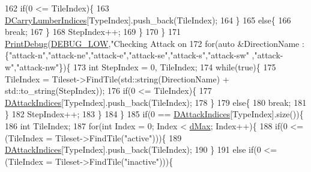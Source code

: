 \begin{DoxyCode}
{{{{162                     \textcolor{keywordflow}{if}(0 <= TileIndex)\{
163                         \hyperlink{classCAssetRenderer_a986dc401334deb267cb772ff0650fcb6}{DCarryLumberIndices}[TypeIndex].push\_back(TileIndex);
164                     \}
165                     \textcolor{keywordflow}{else}\{
166                         \textcolor{keywordflow}{break};   
167                     \}
168                     StepIndex++;
169                 \}
170             \}
171             \hyperlink{Debug_8h_aa5f00f5537c9760f6ae1782460748ab9}{PrintDebug}(\hyperlink{Debug_8h_a3a5f3fc09784650d8388cb854882f840}{DEBUG\_LOW},\textcolor{stringliteral}{"Checking Attack on %
172             \textcolor{keywordflow}{for}(\textcolor{keyword}{auto} &DirectionName : \{\textcolor{stringliteral}{"attack-n"},\textcolor{stringliteral}{"attack-ne"},\textcolor{stringliteral}{"attack-e"},\textcolor{stringliteral}{"attack-se"},\textcolor{stringliteral}{"attack-s"},\textcolor{stringliteral}{"attack-sw"}
      ,\textcolor{stringliteral}{"attack-w"},\textcolor{stringliteral}{"attack-nw"}\})\{
173                 \textcolor{keywordtype}{int} StepIndex = 0, TileIndex;
174                 \textcolor{keywordflow}{while}(\textcolor{keyword}{true})\{
175                     TileIndex = Tileset->FindTile(std::string(DirectionName) + std::to\_string(StepIndex));
176                     \textcolor{keywordflow}{if}(0 <= TileIndex)\{
177                         \hyperlink{classCAssetRenderer_acc2d0fab5a9f1f35a1d5eaf28ff743cc}{DAttackIndices}[TypeIndex].push\_back(TileIndex);
178                     \}
179                     \textcolor{keywordflow}{else}\{
180                         \textcolor{keywordflow}{break};   
181                     \}
182                     StepIndex++;
183                 \}
184             \}
185             \textcolor{keywordflow}{if}(0 == \hyperlink{classCAssetRenderer_acc2d0fab5a9f1f35a1d5eaf28ff743cc}{DAttackIndices}[TypeIndex].size())\{
186                 \textcolor{keywordtype}{int} TileIndex;
187                 \textcolor{keywordflow}{for}(\textcolor{keywordtype}{int} Index = 0; Index < \hyperlink{GameDataTypes_8h_acb2b033915f6659a71a38b5aa6e4eb42af6546049275557ce0ade2ceee042a319}{dMax}; Index++)\{
188                     \textcolor{keywordflow}{if}(0 <= (TileIndex = Tileset->FindTile(\textcolor{stringliteral}{"active"})))\{
189                         \hyperlink{classCAssetRenderer_acc2d0fab5a9f1f35a1d5eaf28ff743cc}{DAttackIndices}[TypeIndex].push\_back(TileIndex);
190                     \}
191                     \textcolor{keywordflow}{else} \textcolor{keywordflow}{if}(0 <= (TileIndex = Tileset->FindTile(\textcolor{stringliteral}{"inactive"})))\{
}}}}}
\end{DoxyCode}
